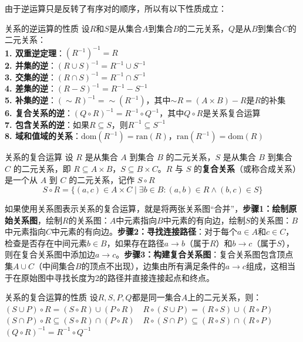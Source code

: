 \documentclass[lang=cn,11pt]{elegantbook}
\begin{document}
由于逆运算只是反转了有序对的顺序，所以有以下性质成立：
\begin{theorem}{关系的逆运算的性质}
设$R$和$S$是从集合$A$到集合$B$的二元关系，$Q$是从$B$到集合$C$的二元关系：\\
\textbf{1. 双重逆定理}：$(R^{-1})^{-1} = R$\\
\textbf{2. 并集的逆}：$(R \cup S)^{-1} = R^{-1} \cup S^{-1}$\\
\textbf{3. 交集的逆}：$(R \cap S)^{-1} = R^{-1} \cap S^{-1}$\\
\textbf{4. 差集的逆}：$(R - S)^{-1} = R^{-1} - S^{-1}$\\
\textbf{5. 补集的逆}：$(\sim R)^{-1} = \sim (R^{-1})$，其中$\sim R = (A \times B) - R$是$R$的补集\\
\textbf{6. 复合关系的逆}：$(Q \circ R)^{-1} = R^{-1} \circ Q^{-1}$，其中$Q \circ R$是关系复合运算\\
\textbf{7. 包含关系的逆}：如果$R \subseteq S$，则$R^{-1} \subseteq S^{-1}$\\
\textbf{8. 域和值域的关系}：$\text{dom}(R^{-1}) = \text{ran}(R)$，$\text{ran}(R^{-1}) = \text{dom}(R)$
\end{theorem}
\begin{definition}{关系的复合运算}
设 $R$ 是从集合 $A$ 到集合 $B$ 的二元关系，$S$ 是从集合 $B$ 到集合 $C$ 的二元关系，即 $R \subseteq A \times B$，$S \subseteq B \times C$。$R$ 与 $S$ 的\textbf{复合关系}（或称合成关系）是一个从 $A$ 到 $C$ 的二元关系，记作 $S \circ R$\vspace{-10pt}
\[
S \circ R = \{(a, c)\in A \times C \mid \exists b \in B : (a, b) \in R \land (b, c) \in S\}
\]
\end{definition}
如果使用关系图表示关系的复合运算，就是将两张关系图“合并”，\textbf{步骤1：绘制原始关系图}，绘制$R$的关系图：$A$中元素指向$B$中元素的有向边，绘制$S$的关系图：$B$中元素指向$C$中元素的有向边。\textbf{步骤2：寻找连接路径}：对于每个$a \in A$和$c \in C$，检查是否存在中间元素$b \in B$，如果存在路径$a \rightarrow b$（属于$R$）和$b \rightarrow c$（属于$S$），则在复合关系图中添加边$a \rightarrow c$。\textbf{步骤3：构建复合关系图}：复合关系图包含顶点集$A \cup C$（中间集合$B$的顶点不出现），边集由所有满足条件的$a \rightarrow c$组成，这相当于在原始图中寻找长度为2的路径并直接连接起点和终点。
\begin{theorem}{关系的复合运算的性质}
设$R,S,P,Q$都是同一集合$A$上的二元关系，则：\\
    $(S\cup P)\circ R=(S\circ R)\cup(P\circ R)\quad R\circ(S\cup P)=(R\circ S)\cup(R\circ P)$\\
    $(S\cap P)\circ R\subseteq(S\circ R)\cap(P\circ R)\quad R\circ(S\cap P)\subseteq(R\circ S)\cap(R\circ P)$\\
    $(Q \circ R)^{-1} = R^{-1} \circ Q^{-1}$
\end{theorem}
\end{document}
